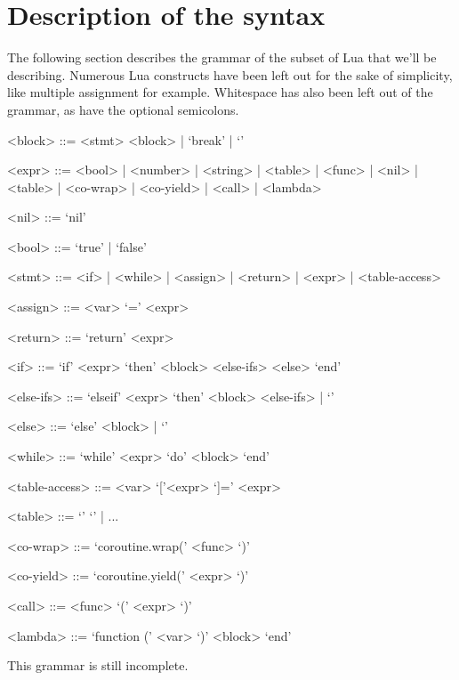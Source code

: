 \documentclass{article}
\begin{document}
\section{Description of the syntax}

The following section describes the grammar of the subset of Lua that we'll be
describing. Numerous Lua constructs have been left out for the sake of
simplicity, like multiple assignment for example. Whitespace has also been left
out of the grammar, as have the optional semicolons. 

\newpage

\begin{grammar}
	<block> ::= <stmt> <block> | `break' | `'
	
	<expr> ::= <bool> | <number> | <string> | <table> | <func>  | <nil> | <table>  | <co-wrap> | <co-yield> | <call>
		| <lambda> 
	
	<nil> ::= `nil'
	
	<bool> ::= `true' | `false'
	
	<stmt> ::= <if> | <while> | <assign> | <return> | <expr> | <table-access> 
	
	<assign> ::= <var> `=' <expr>
	
	<return> ::= `return' <expr>
	
	<if> ::= `if' <expr> `then' <block> <else-ifs> <else> `end'
	
	<else-ifs> ::= `elseif' <expr> `then' <block> <else-ifs> | `'
	
	<else> ::= `else' <block> | `'
	
	<while> ::= `while' <expr> `do' <block> `end'
	
	<table-access> ::= <var> `['<expr> `]=' <expr>
	
	<table> ::= `{' `}' | ...

	<co-wrap> ::= `coroutine.wrap(' <func> `)'

	<co-yield> ::= `coroutine.yield(' <expr> `)'

	<call> ::= <func> `(' <expr> `)'

	<lambda> ::= `function (' <var> `)' <block> `end'
\end{grammar}

This grammar is still incomplete.

\end{document}
